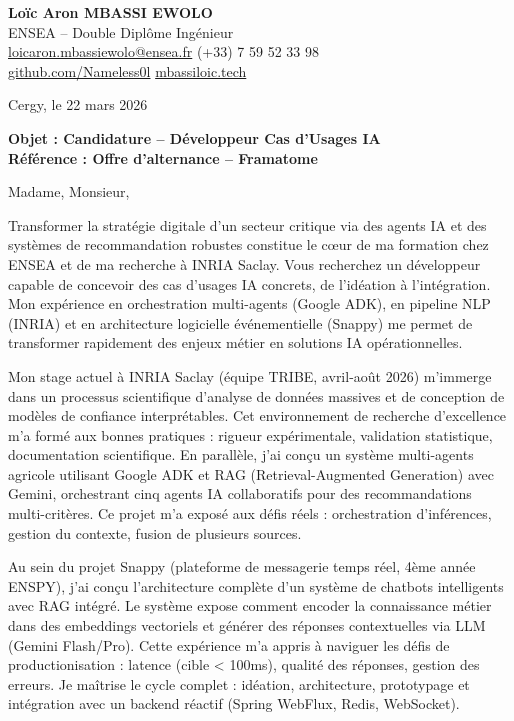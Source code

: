 \documentclass[a4paper,11pt]{article}
\begin{document}
\noindent
\textbf{Loïc Aron MBASSI EWOLO} \\
ENSEA -- Double Diplôme Ingénieur \\
\href{mailto:loicaron.mbassiewolo@ensea.fr}{loicaron.mbassiewolo@ensea.fr} \quad (+33) 7 59 52 33 98 \\
\href{https://github.com/Nameless0l}{github.com/Nameless0l} \quad \href{https://mbassiloic.tech}{mbassiloic.tech}

\vspace{1em}
\noindent Cergy, le 22 mars 2026

\vspace{1em}
\noindent
\textbf{Objet : Candidature -- Développeur Cas d'Usages IA} \\
\textbf{Référence : Offre d'alternance -- Framatome}

\vspace{1.5em}
\noindent Madame, Monsieur,

\vspace{0.8em}
Transformer la stratégie digitale d'un secteur critique via des agents IA et des systèmes de recommandation robustes constitue le cœur de ma formation chez ENSEA et de ma recherche à INRIA Saclay. Vous recherchez un développeur capable de concevoir des cas d'usages IA concrets, de l'idéation à l'intégration. Mon expérience en orchestration multi-agents (Google ADK), en pipeline NLP (INRIA) et en architecture logicielle événementielle (Snappy) me permet de transformer rapidement des enjeux métier en solutions IA opérationnelles.

\vspace{0.8em}
Mon stage actuel à INRIA Saclay (équipe TRIBE, avril-août 2026) m'immerge dans un processus scientifique d'analyse de données massives et de conception de modèles de confiance interprétables. Cet environnement de recherche d'excellence m'a formé aux bonnes pratiques : rigueur expérimentale, validation statistique, documentation scientifique. En parallèle, j'ai conçu un système multi-agents agricole utilisant Google ADK et RAG (Retrieval-Augmented Generation) avec Gemini, orchestrant cinq agents IA collaboratifs pour des recommandations multi-critères. Ce projet m'a exposé aux défis réels : orchestration d'inférences, gestion du contexte, fusion de plusieurs sources.

\vspace{0.8em}
Au sein du projet Snappy (plateforme de messagerie temps réel, 4ème année ENSPY), j'ai conçu l'architecture complète d'un système de chatbots intelligents avec RAG intégré. Le système expose comment encoder la connaissance métier dans des embeddings vectoriels et générer des réponses contextuelles via LLM (Gemini Flash/Pro). Cette expérience m'a appris à naviguer les défis de productionisation : latence (cible < 100ms), qualité des réponses, gestion des erreurs. Je maîtrise le cycle complet : idéation, architecture, prototypage et intégration avec un backend réactif (Spring WebFlux, Redis, WebSocket).
\end{document}
